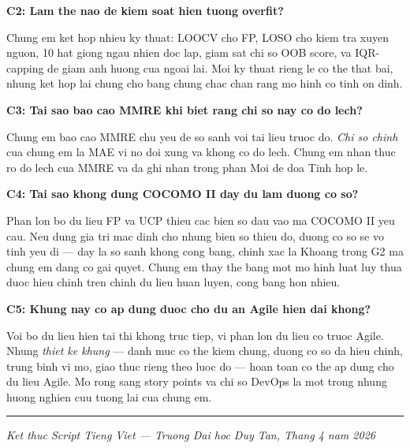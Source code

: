 \documentclass[12pt,a4paper]{article}
\newcommand{\say}[1]{%
  \begin{mdframed}[backgroundcolor=bglight, linecolor=slideblue!40,
    leftmargin=0pt, rightmargin=0pt, innerleftmargin=12pt,
    innerrightmargin=12pt, innertopmargin=8pt, innerbottommargin=8pt,
    linewidth=1.5pt]
  #1
  \end{mdframed}
}
\begin{document}
\noindent\textbf{C2: Lam the nao de kiem soat hien tuong overfit?}

\say{
Chung em ket hop nhieu ky thuat: LOOCV cho FP, LOSO cho kiem tra xuyen nguon, 10 hat giong ngau nhien doc lap, giam sat chi so OOB score, va IQR-capping de giam anh huong cua ngoai lai. Moi ky thuat rieng le co the that bai, nhung ket hop lai chung cho bang chung chac chan rang mo hinh co tinh on dinh.
}

\noindent\textbf{C3: Tai sao bao cao MMRE khi biet rang chi so nay co do lech?}

\say{
Chung em bao cao MMRE chu yeu de so sanh voi tai lieu truoc do. \textit{Chi so chinh} cua chung em la MAE vi no doi xung va khong co do lech. Chung em nhan thuc ro do lech cua MMRE va da ghi nhan trong phan Moi de doa Tinh hop le.
}

\noindent\textbf{C4: Tai sao khong dung COCOMO II day du lam duong co so?}

\say{
Phan lon bo du lieu FP va UCP thieu cac bien so dau vao ma COCOMO II yeu cau. Neu dung gia tri mac dinh cho nhung bien so thieu do, duong co so se vo tinh yeu di --- day la so sanh khong cong bang, chinh xac la Khoang trong G2 ma chung em dang co gai quyet. Chung em thay the bang mot mo hinh luat luy thua duoc hieu chinh tren chinh du lieu huan luyen, cong bang hon nhieu.
}

\noindent\textbf{C5: Khung nay co ap dung duoc cho du an Agile hien dai khong?}

\say{
Voi bo du lieu hien tai thi khong truc tiep, vi phan lon du lieu co truoc Agile. Nhung \textit{thiet ke khung} --- danh muc co the kiem chung, duong co so da hieu chinh, trung binh vi mo, giao thuc rieng theo luoc do --- hoan toan co the ap dung cho du lieu Agile. Mo rong sang story points va chi so DevOps la mot trong nhung huong nghien cuu tuong lai cua chung em.
}

\vspace{1em}
\hrule
\begin{center}
\textit{\small Ket thuc Script Tieng Viet --- Truong Dai hoc Duy Tan, Thang 4 nam 2026}
\end{center}
\end{document}
